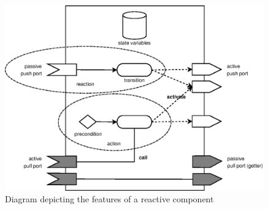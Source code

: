 \begin{figure}
\centering
\includegraphics[width=\textwidth]{reactive_component.eps}
\caption{Diagram depicting the features of a reactive component\label{reactive_component}}
\end{figure}

